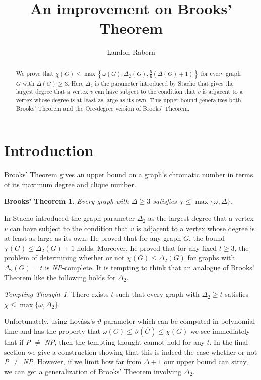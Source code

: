 \documentclass[12pt]{amsart}
\title{An improvement on Brooks' Theorem}
\author{Landon Rabern}
\theoremstyle{plain}
\newtheorem*{BrooksTheorem}{Brooks' Theorem}
\theoremstyle{definition}
\theoremstyle{remark}
\newtheorem*{TemptingThought}{Tempting Thought}
\begin{document}
\begin{abstract}
We prove that $\chi(G) \leq \max \left\{\omega(G), \Delta_2(G), \frac{5}{6}(\Delta(G) + 1)\right\}$ for every graph $G$ with $\Delta(G) \geq 3$.  Here $\Delta_2$ is the parameter introduced by Stacho that gives the largest degree that a vertex $v$ can have subject to the condition that $v$ is adjacent to a vertex whose degree is at least as large as its own.  This upper bound generalizes both Brooks' Theorem and the Ore-degree version of Brooks' Theorem.  
\end{abstract}
\maketitle
\section{Introduction}
Brooks' Theorem \cite{Brooks} gives an upper bound on a graph's chromatic number in terms of its maximum degree and clique number.  

\begin{BrooksTheorem}
Every graph with $\Delta \geq 3$ satisfies $\chi \leq \max\{\omega, \Delta\}$.
\end{BrooksTheorem}

In \cite{Stacho} Stacho introduced the graph parameter $\Delta_2$ as the largest degree that a vertex $v$ can have subject to the condition that $v$ is adjacent to a vertex whose degree is at least as large as its own.  He proved that for any graph $G$, the bound $\chi(G) \leq \Delta_2(G) + 1$ holds. Moreover, he proved that for any fixed $t \geq 3$, the problem of determining whether or not $\chi(G) \leq \Delta_2(G)$ for graphs with $\Delta_2(G) = t$ is \emph{NP}-complete.  It is tempting to think that an analogue of Brooks' Theorem like the following holds for $\Delta_2$.

\begin{TemptingThought}
There exists $t$ such that every graph with $\Delta_2 \geq t$ satisfies $\chi \leq \max \{\omega, \Delta_2\}$.
\end{TemptingThought}

Unfortunately, using Lov\'{a}sz's $\vartheta$ parameter \cite{Lovasz} which can be computed in polynomial time and has the property that $\omega(G) \leq \vartheta(\overline{G}) \leq \chi(G)$ we see immediately that if \emph{P} $\neq$ \emph{NP}, then the tempting thought cannot hold for any $t$.  In the final section we give a construction showing that this is indeed the case whether or not \emph{P} $\neq$ \emph{NP}. However, if we limit how far from $\Delta + 1$ our upper bound can stray, we can get a generalization of Brooks' Theorem involving $\Delta_2$.
\end{document}
